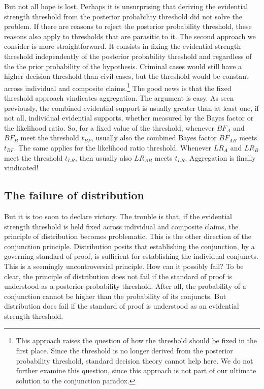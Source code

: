 \documentclass[
  10pt,
  dvipsnames,enabledeprecatedfontcommands]{scrartcl}
\begin{document}
But not all hope is lost. Perhaps it is unsurprising that deriving the
evidential strength threshold from the posterior probability threshold
did not solve the problem. If there are reasons to reject the posterior
probability threshold, these reasons also apply to thresholds that are
parasitic to it. The second approach we consider is more
straightforward. It consists in fixing the evidential strength threshold
independently of the posterior probability threshold and regardless of
the the prior probability of the hypothesis. Criminal cases would still
have a higher decision threshold than civil cases, but the threshold
would be constant across individual and composite claims.\footnote{ This
  approach raises the question of how the threshold should be fixed in
  the first place. Since the threshold is no longer derived from the
  posterior probability threshold, standard decision theory cannot help
  here. We do not further examine this question, since this approach is
  not part of our ultimate solution to the conjunction paradox.} The
good news is that the fixed threshold approach vindicates aggregation.
The argument is easy. As seen previously, the combined evidential
support is usually greater than at least one, if not all, individual
evidential supports, whether measured by the Bayes factor or the
likelihood ratio. So, for a fixed value of the threshold, whenever
\(BF_A\) and \(BF_B\) meet the threshold \(t_{BF}\), usually also the
combined Bayes factor \(BF_{AB}\) meets \(t_{BF}\). The same applies for
the likelihood ratio threshold. Whenever \(LR_A\) and \(LR_B\) meet the
threshold \(t_{LR}\), then usually also \(LR_{AB}\) meets \(t_{LR}\).
Aggregation is finally vindicated!

\hypertarget{the-failure-of-distribution}{%
\subsection{The failure of
distribution}\label{the-failure-of-distribution}}

But it is too soon to declare victory. The trouble is that, if the
evidential strength threshold is held fixed across individual and
composite claims, the principle of distribution becomes problematic.
This is the other direction of the conjunction principle. Distribution
posits that establishing the conjunction, by a governing standard of
proof, is sufficient for establishing the individual conjuncts. This is
a seemingly uncontroversial principle. How can it possibly fail? To be
clear, the principle of distribution does not fail if the standard of
proof is understood as a posterior probability threshold. After all, the
probability of a conjunction cannot be higher than the probability of
its conjuncts. But distribution does fail if the standard of proof is
understood as an evidential strength threshold.
\end{document}
